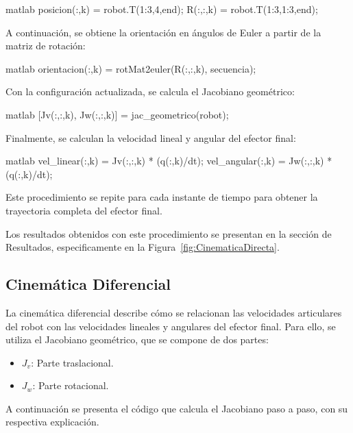 \begin{matlabcode}{matlab}
	posicion(:,k) = robot.T(1:3,4,end);
	R(:,:,k) = robot.T(1:3,1:3,end);
\end{matlabcode}

A continuación, se obtiene la orientación en ángulos de Euler a partir de la matriz de rotación:

\begin{matlabcode}{matlab}
	orientacion(:,k) = rotMat2euler(R(:,:,k), secuencia);
\end{matlabcode}

Con la configuración actualizada, se calcula el Jacobiano geométrico:

\begin{matlabcode}{matlab}
	[Jv(:,:,k), Jw(:,:,k)] = jac_geometrico(robot);
\end{matlabcode}

Finalmente, se calculan la velocidad lineal y angular del efector final:

\begin{matlabcode}{matlab}
	vel_linear(:,k)  = Jv(:,:,k) * (q(:,k)/dt);
	vel_angular(:,k) = Jw(:,:,k) * (q(:,k)/dt);
\end{matlabcode}

Este procedimiento se repite para cada instante de tiempo para obtener la trayectoria completa del efector final.

Los resultados obtenidos con este procedimiento se presentan en la sección de Resultados, especificamente en la Figura~\ref{fig:CinematicaDirecta}.

\subsection{Cinemática Diferencial}

La cinemática diferencial describe cómo se relacionan las velocidades articulares del robot con las velocidades lineales y angulares del efector final. Para ello, se utiliza el Jacobiano geométrico, que se compone de dos partes:
\begin{itemize}
	\item $J_v$: Parte traslacional.
	\item $J_w$: Parte rotacional.
\end{itemize}

A continuación se presenta el código que calcula el Jacobiano paso a paso, con su respectiva explicación.

